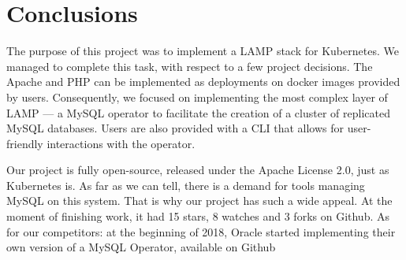 \section{Conclusions}
The purpose of this project was to implement a LAMP stack for Kubernetes. We managed to complete
this task, with respect to a few project decisions. The Apache and PHP can be implemented as
deployments on docker images provided by users. Consequently, we focused on implementing the most
complex layer of LAMP --- a MySQL operator to facilitate the creation of a cluster of replicated
MySQL databases. Users are also provided with a CLI that allows for user-friendly interactions with
the operator.

Our project is fully open-source, released under the Apache License 2.0, just as Kubernetes is. As
far as we can tell, there is a demand for tools managing MySQL on this system. That is why our
project has such a wide appeal. At the moment of finishing work, it had 15 stars, 8 watches and 3
forks on Github. As for our competitors: at the beginning of 2018, Oracle started implementing their
own version of a MySQL Operator, available on Github~\cite{oracle}
